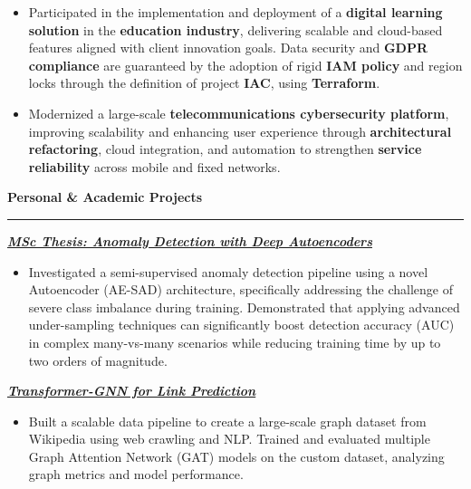 \documentclass[9pt, a4paper]{article}
\newcommand{\cvsection}[1]{%
	\vspace{2pt}\par
	{\Large\bfseries\color{sectionblue}#1}\par
	\vspace{2pt}\hrule\vspace{6pt}
}
\newcommand{\cvproject}[1]{%
	\par {{\bfseries{\textit{#1}}}} \par \vspace{4pt}
}
\begin{document}
\begin{minipage}[t]{0.65\linewidth}
\begin{itemize}[leftmargin=*, nosep]
			\vspace{5pt}
			\item \footnotesize Participated in the implementation and deployment of a \textbf{digital learning solution} in the \textbf{education industry}, delivering scalable and cloud-based features aligned with client innovation goals. Data security and \textbf{GDPR compliance} are guaranteed by the adoption of rigid \textbf{IAM policy} and region locks through the definition of project \textbf{IAC}, using \textbf{Terraform}. 
			
			
			\vspace{5pt}
			\item \footnotesize Modernized a large-scale \textbf{telecommunications cybersecurity platform}, improving scalability and enhancing user experience through \textbf{architectural refactoring}, cloud integration, and automation to strengthen \textbf{service reliability} across mobile and fixed networks. 
		\end{itemize}
		
		\vspace{10pt}\par
		\cvsection{Personal \& Academic Projects}
		
		\cvproject{\href{https://github.com/bGuzzo/msc-ai-ml-thesis-anomaly-detection}{MSc Thesis: Anomaly Detection with Deep Autoencoders}}
		\begin{itemize}[leftmargin=*, nosep]
			\item \footnotesize Investigated a semi-supervised anomaly detection pipeline using a novel Autoencoder (AE-SAD) architecture, specifically addressing the challenge of severe class imbalance during training. Demonstrated that applying advanced under-sampling techniques can significantly boost detection accuracy (AUC) in complex many-vs-many scenarios while reducing training time by up to two orders of magnitude.
		\end{itemize}
		
		\vspace{5pt}
		\cvproject{\href{https://github.com/bGuzzo/transformer-gnn-link-prediction}{Transformer-GNN for Link Prediction}}
		\begin{itemize}[leftmargin=*, nosep]
			\item \footnotesize Built a scalable data pipeline to create a large-scale graph dataset from Wikipedia using web crawling and NLP. Trained and evaluated multiple Graph Attention Network (GAT) models on the custom dataset, analyzing graph metrics and model performance.
		\end{itemize}
		

\end{minipage}
\end{document}
